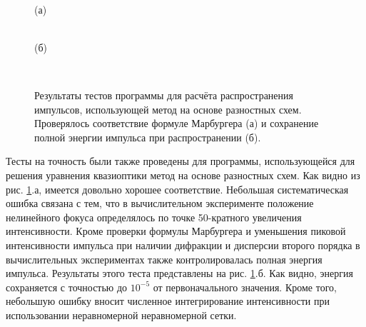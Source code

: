 
\begin{figure}[H]
    \begin{center}
        \begin{minipage}{\minipagewidthtwo}
             \\
            \footnotesize{(а)}
        \end{minipage}
        \hfill
        \begin{minipage}{\minipagewidthtwo}
             \\
            \footnotesize{(б)}
        \end{minipage}
        \\[1ex]
        \caption{Результаты тестов программы для расчёта распространения импульсов, использующей метод на основе разностных схем.
                 Проверялось соответствие формуле Марбургера (а) и сохранение полной энергии импульса при распространении (б).}
        \label{fig:ModelTestImpulses}
    \end{center}
\end{figure}


Тесты на точность были также  проведены для программы, использующейся для решения уравнения квазиоптики метод на основе разностных схем.
Как видно из рис. \ref{fig:ModelTestImpulses}.а, имеется довольно хорошее соответствие. Небольшая систематическая ошибка связана с тем,
что в вычислительном эксперименте положение нелинейного фокуса определялось по точке 50-кратного увеличения интенсивности.
Кроме проверки формулы Марбургера и уменьшения пиковой интенсивности импульса при наличии дифракции и дисперсии второго порядка
в вычислительных экспериментах также контролировалась полная энергия импульса. Результаты этого теста представлены на рис. \ref{fig:ModelTestImpulses}.б.
Как видно, энергия сохраняется с точностью до $10^{-5}$ от первоначального значения. Кроме того, небольшую ошибку вносит
численное интегрирование интенсивности при использовании неравномерной неравномерной сетки.
